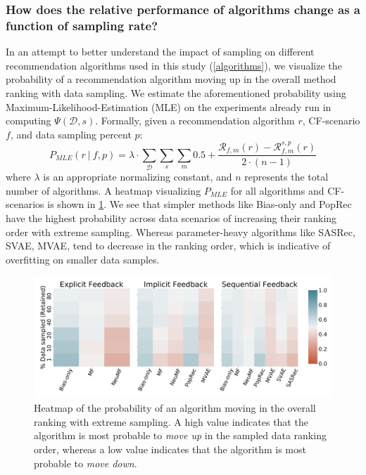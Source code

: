 

\subsubsection{How does the relative performance of algorithms change as a function of sampling rate? \ \ } In an attempt to better understand the impact of sampling on different recommendation algorithms used in this study (\cref{algorithms}), we visualize the probability of a recommendation algorithm moving up in the overall method ranking with data sampling. We estimate the aforementioned probability using Maximum-Likelihood-Estimation (MLE) on the experiments already run in computing $\Psi(\mathcal{D}, s)$. Formally, given a recommendation algorithm $r$, CF-scenario $f$, and data sampling percent $p$:
\begin{equation*}
    P_{\mathit{MLE}}(r ~|~ f, p) = \lambda \cdot \sum_{\mathcal{D}} \sum_{s} \sum_{m} 0.5 + \frac{\mathcal{R}_{f, m}(r) - \mathcal{R}_{f, m}^{s, p}(r)}{2 \cdot (n-1)}
\end{equation*}
where $\lambda$ is an appropriate normalizing constant, and $n$ represents the total number of algorithms. A heatmap visualizing $P_{\mathit{MLE}}$ for all algorithms and CF-scenarios is shown in \cref{percent_sampling_vs_method}. We see that simpler methods like Bias-only and PopRec have the highest probability across data scenarios of increasing their ranking order with extreme sampling. Whereas parameter-heavy algorithms like SASRec, SVAE, MVAE, \etc tend to decrease in the ranking order, which is indicative of overfitting on smaller data samples.
\begin{figure}[ht!]     
    \centering
    \vspace{-0.1cm}
    \includegraphics[width=0.9\linewidth]{figures/percent_sampling_vs_method.pdf}
    \vspace{-0.4cm}
    \caption{Heatmap of the probability of an algorithm moving in the overall ranking with extreme sampling. A high value indicates that the algorithm is most probable to \emph{move up} in the sampled data ranking order, whereas a low value indicates that the algorithm is most probable to \emph{move down}.}
    \label{percent_sampling_vs_method}
    \vspace{-0.3cm}
\end{figure}

